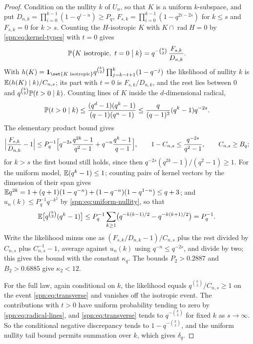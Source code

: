 \begin{proof}
Condition on the nullity $k$ of $U_n$, so that $K$ is a uniform $k$-subspace, and put
$D_{n,k}=\prod_{i=0}^{k-1}(1-q^{i-n})\ge P_q$, $F_{s,k}=\prod_{i=0}^{k-1}(1-q^{2i-2s})$ for
$k\le s$ and $F_{s,k}=0$ for $k>s$. Counting the $H$-isotropic $K$ with
$K\cap\operatorname{rad}H=0$ by \eqref{spn:eq:kernel-types} with $t=0$ gives
\begin{equation}\label{spn:eq:transverse}
 \mathbb{P}\bigl(K\text{ isotropic},\ t=0\bigm|k\bigr)=q^{-\binom k2}\,\frac{F_{s,k}}{D_{n,k}} .
\end{equation}
With $h(K)=\mathbf 1_{\set{K\text{ isotropic}}}q^{\binom k2}\prod_{j=k-t+1}^k(1-q^{-j})$ the
likelihood of nullity $k$ is $\mathbb{E}(h(K)\mid k)/C_{n,s}$; its part with $t=0$ is
$F_{s,k}/D_{n,k}$, and the rest lies between $0$ and $q^{\binom k2}\mathbb{P}(t>0\mid k)$. Counting
lines of $K$ inside the $d$-dimensional radical,
\begin{equation}\label{spn:eq:radical-lines}
 \mathbb{P}(t>0\mid k)\le\frac{(q^d-1)(q^k-1)}{(q-1)(q^n-1)}\le\frac{q}{(q-1)^2}(q^k-1)q^{-2s}.
\end{equation}
The elementary product bound gives
\[
 \Bigl|\frac{F_{s,k}}{D_{n,k}}-1\Bigr|\le P_q^{-1}\Bigl[q^{-2s}\frac{q^{2k}-1}{q^2-1}
 +q^{-n}\frac{q^k-1}{q-1}\Bigr],\qquad 1-C_{n,s}\le\frac{q^{-2s}}{q^2-1},\qquad
 C_{n,s}\ge B_q;
\]
for $k>s$ the first bound still holds, since then $q^{-2s}(q^{2k}-1)/(q^2-1)\ge1$. For the
uniform model, $\mathbb{E}(q^k-1)\le1$; counting pairs of kernel vectors by the dimension of their
span gives $\mathbb{E} q^{2k}=1+(q+1)(1-q^{-n})+(1-q^{-n})(1-q^{1-n})\le q+3$; and
$u_n(k)\le P_q^{-1}q^{-k^2}$ by \eqref{spn:eq:uniform-nullity}, so that
\[
 \mathbb{E}\bigl[q^{\binom k2}(q^k-1)\bigr]\le P_q^{-1}\sum_{k\ge1}
 \bigl(q^{-k(k-1)/2}-q^{-k(k+1)/2}\bigr)=P_q^{-1}.
\]
Write the likelihood minus one as $(F_{s,k}/D_{n,k}-1)/C_{n,s}$ plus the rest divided by
$C_{n,s}$ plus $C_{n,s}^{-1}-1$, average against $u_n(k)$ using $q^{-n}\le q^{-2s}$, and divide
by two; this gives the bound with the constant $\kappa_q$. The bounds $P_2>0.2887$ and
$B_2>0.6885$ give $\kappa_2<12$.

For the full law, again conditional on $k$, the likelihood equals
$q^{\binom k2}/C_{n,s}\ge1$ on the event \eqref{spn:eq:transverse} and vanishes off the
isotropic event. The contributions with $t>0$ have uniform probability tending to zero by
\eqref{spn:eq:radical-lines}, and \eqref{spn:eq:transverse} tends to $q^{-\binom k2}$ for fixed
$k$ as $s\to\infty$. So the conditional negative discrepancy tends to $1-q^{-\binom k2}$, and
the uniform nullity tail bound permits summation over $k$, which gives $\delta_q$.
\end{proof}


